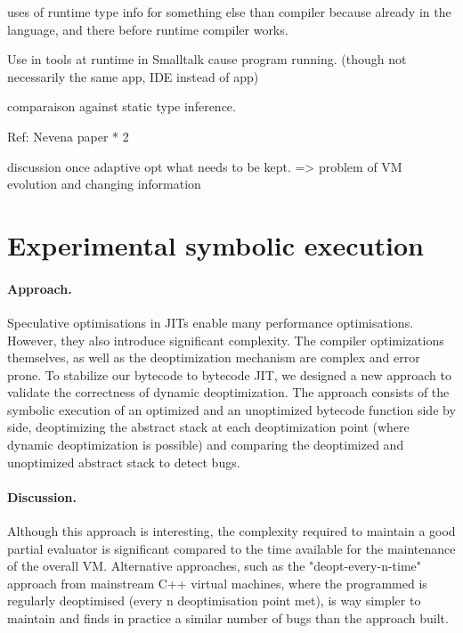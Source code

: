 \documentclass[a4paper,12pt,twoside]{../includes/ThesisStyle}
\begin{document}
uses of runtime type info for something else than compiler because already in the language, and there before runtime compiler works.

Use in tools at runtime in Smalltalk cause program running. (though not necessarily the same app, IDE instead of app)

comparaison against static type inference.

Ref: Nevena paper * 2

discussion once adaptive opt what needs to be kept.
=> problem of VM evolution and changing information

\section{Experimental symbolic execution}

\paragraph{Approach.}Speculative optimisations in JITs enable many performance optimisations. However, they also introduce significant complexity. The compiler optimizations themselves, as well as the deoptimization mechanism are complex and error prone. To stabilize our bytecode to bytecode JIT, we designed a new approach to validate the correctness of dynamic deoptimization. The approach \cite{Bera16a} consists of the symbolic execution of an optimized and an unoptimized bytecode function side by side, deoptimizing the abstract stack at each deoptimization point (where dynamic deoptimization is possible) and comparing the deoptimized and unoptimized abstract stack to detect bugs. 

\paragraph{Discussion.}Although this approach is interesting, the complexity required to maintain a good partial evaluator is significant compared to the time available for the maintenance of the overall VM. Alternative approaches, such as the "deopt-every-n-time" approach from mainstream C++ virtual machines, where the programmed is regularly deoptimised (every n deoptimisation point met), is way simpler to maintain and finds in practice a similar number of bugs than the approach built. 

\ifx\wholebook\relax\else
    
\end{document}
